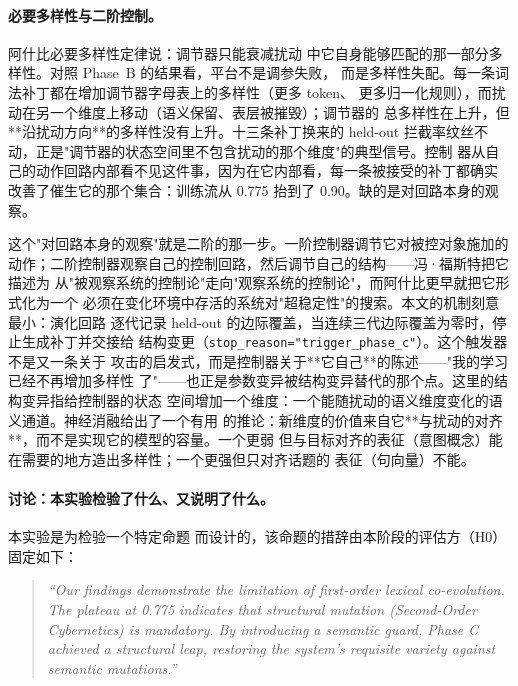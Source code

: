 \paragraph{必要多样性与二阶控制。} 阿什比必要多样性定律说：调节器只能衰减扰动
中它自身能够匹配的那一部分多样性。对照 Phase~B 的结果看，平台不是调参失败，
而是多样性失配。每一条词法补丁都在增加调节器字母表上的多样性（更多 token、
更多归一化规则），而扰动在另一个维度上移动（语义保留、表层被摧毁）；调节器的
总多样性在上升，但**沿扰动方向**的多样性没有上升。十三条补丁换来的 held-out
拦截率纹丝不动，正是"调节器的状态空间里不包含扰动的那个维度"的典型信号。控制
器从自己的动作回路内部看不见这件事，因为在它内部看，每一条被接受的补丁都确实
改善了催生它的那个集合：训练流从 0.775 抬到了 0.90。缺的是对回路本身的观察。

这个"对回路本身的观察"就是二阶的那一步。一阶控制器调节它对被控对象施加的
动作；二阶控制器观察自己的控制回路，然后调节自己的结构——冯·福斯特把它描述为
从"被观察系统的控制论"走向"观察系统的控制论"，而阿什比更早就把它形式化为一个
必须在变化环境中存活的系统对"超稳定性"的搜索。本文的机制刻意最小：演化回路
逐代记录 held-out 的边际覆盖，当连续三代边际覆盖为零时，停止生成补丁并交接给
结构变更（\texttt{stop\_reason="trigger\_phase\_c"}）。这个触发器不是又一条关于
攻击的启发式，而是控制器关于**它自己**的陈述——"我的学习已经不再增加多样性
了"——也正是参数变异被结构变异替代的那个点。这里的结构变异指给控制器的状态
空间增加一个维度：一个能随扰动的语义维度变化的语义通道。神经消融给出了一个有用
的推论：新维度的价值来自它**与扰动的对齐**，而不是实现它的模型的容量。一个更弱
但与目标对齐的表征（意图概念）能在需要的地方造出多样性；一个更强但只对齐话题的
表征（句向量）不能。

\paragraph{讨论：本实验检验了什么、又说明了什么。} 本实验是为检验一个特定命题
而设计的，该命题的措辞由本阶段的评估方（H0）固定如下：

\begin{quote}
\emph{``Our findings demonstrate the limitation of first-order lexical
co-evolution. The plateau at 0.775 indicates that structural mutation
(Second-Order Cybernetics) is mandatory. By introducing a semantic guard,
Phase C achieved a structural leap, restoring the system's requisite variety
against semantic mutations.''}
\end{quote}


